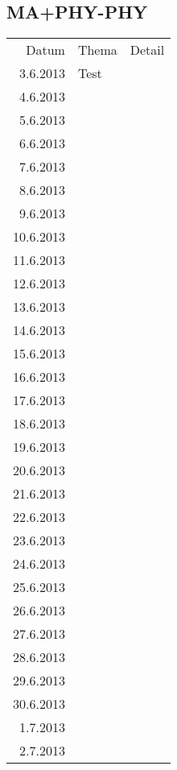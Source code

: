 \subsection{MA+PHY-PHY}
\begin{tabular}{r l p{}}
\rowcolor{lgray} Datum     & Thema         & Detail \\
\rowcolor{white}  3.6.2013 & Test          &  \\
\rowcolor{lgray}  4.6.2013 &               &  \\
\rowcolor{white}  5.6.2013 &               &  \\
\rowcolor{lgray}  6.6.2013 &               &  \\
\rowcolor{white}  7.6.2013 &               &  \\
\rowcolor{lgray}  8.6.2013 &               &  \\
\rowcolor{white}  9.6.2013 &               &  \\
\rowcolor{lgray} 10.6.2013 &               &  \\
\rowcolor{white} 11.6.2013 &               &  \\
\rowcolor{lgray} 12.6.2013 &               &  \\
\rowcolor{white} 13.6.2013 &               &  \\
\rowcolor{lgray} 14.6.2013 &               &  \\
\rowcolor{white} 15.6.2013 &               &  \\
\rowcolor{lgray} 16.6.2013 &               &  \\
\rowcolor{white} 17.6.2013 &               &  \\
\rowcolor{lgray} 18.6.2013 &               &  \\
\rowcolor{white} 19.6.2013 &               &  \\
\rowcolor{lgray} 20.6.2013 &               &  \\
\rowcolor{white} 21.6.2013 &               &  \\
\rowcolor{lgray} 22.6.2013 &               &  \\
\rowcolor{white} 23.6.2013 &               &  \\
\rowcolor{lgray} 24.6.2013 &               &  \\
\rowcolor{white} 25.6.2013 &               &  \\
\rowcolor{lgray} 26.6.2013 &               &  \\
\rowcolor{white} 27.6.2013 &               &  \\
\rowcolor{lgray} 28.6.2013 &               &  \\
\rowcolor{white} 29.6.2013 &               &  \\
\rowcolor{lgray} 30.6.2013 &               &  \\
\rowcolor{white}  1.7.2013 &               &  \\
\rowcolor{lgray}  2.7.2013 &               &  \\
\end{tabular}

